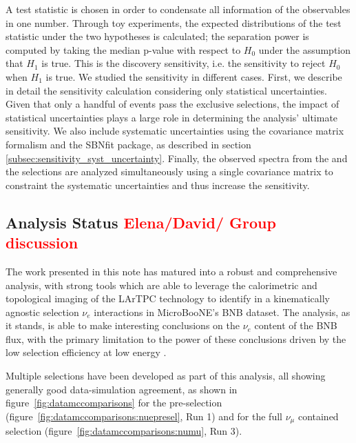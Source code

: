 A test statistic is chosen in order to condensate all information of the observables in one number.
Through toy experiments, the expected distributions of the test statistic under the two hypotheses is calculated; the separation power is computed by taking the median p-value with respect to $H_0$ under the assumption that %
 $H_1$ is true. This is the discovery sensitivity, i.e. the sensitivity to reject $H_0$ when $H_1$ is true.
We studied the sensitivity in different cases. First, we describe in detail the sensitivity calculation considering only statistical uncertainties. Given that only a handful of events pass the exclusive selections, the impact of statistical uncertainties plays a large role in determining the analysis' ultimate sensitivity. We also include systematic uncertainties using the covariance matrix formalism and the SBNfit package, as described in section \ref{subsec:sensitivity_syst_uncertainty}.
Finally, the observed spectra from the \nueccnopinp and the \numu selections are analyzed simultaneously using a single covariance matrix to constraint the systematic uncertainties and thus increase the sensitivity.

\subsection{Analysis Status \textcolor{red}{Elena/David/ Group discussion}}

\par The work presented in this note has matured into a robust and comprehensive analysis, with strong tools which are able to leverage the calorimetric and topological imaging of the LArTPC technology to identify in a kinematically agnostic selection $\nu_e$ interactions in MicroBooNE's BNB dataset. The analysis, as it stands, is able to make interesting conclusions on the $\nu_e$ content of the BNB flux, with the primary limitation to the power of these conclusions driven by the low selection efficiency at low energy .
\par Multiple selections have been developed as part of this analysis, all showing generally good data-simulation agreement, as shown in figure~\ref{fig:datamccomparisons} for the \npsel pre-selection (figure~\ref{fig:datamccomparisons:nuepresel}, Run 1) and for the full $\nu_{\mu}$ contained selection (figure~\ref{fig:datamccomparisons:numu}, Run 3).


